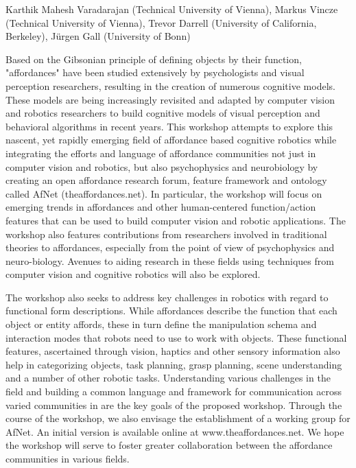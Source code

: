 \begin{spacing}{1.0}
{Karthik Mahesh Varadarajan (Technical University of Vienna), Markus Vincze (Technical University of Vienna), Trevor Darrell (University of California, Berkeley), Jürgen Gall (University of Bonn)}
{
Based on the Gibsonian principle of defining objects by their function, "affordances" have been studied extensively by psychologists and visual perception researchers, resulting in the creation of numerous cognitive models. These models are being increasingly revisited and adapted by computer vision and robotics researchers to build cognitive models of visual perception and behavioral algorithms in recent years. This workshop attempts to explore this nascent, yet rapidly emerging field of affordance based cognitive robotics while integrating the efforts and language of affordance communities not just in computer vision and robotics, but also psychophysics and neurobiology by creating an open affordance research forum, feature framework and ontology called AfNet (theaffordances.net). In particular, the workshop will focus on emerging trends in affordances and other human-centered function/action features that can be used to build computer vision and robotic applications. The workshop also features contributions from researchers involved in traditional theories to affordances, especially from the point of view of psychophysics and neuro-biology. Avenues to aiding research in these fields using techniques from computer vision and cognitive robotics will also be explored.

The workshop also seeks to address key challenges in robotics with regard to functional form descriptions. While affordances describe the function that each object or entity affords, these in turn define the manipulation schema and interaction modes that robots need to use to work with objects. These functional features, ascertained through vision, haptics and other sensory information also help in categorizing objects, task planning, grasp planning, scene understanding and a number of other robotic tasks. Understanding various challenges in the field and building a common language and framework for communication across varied communities in are the key goals of the proposed workshop. Through the course of the workshop, we also envisage the establishment of a working group for AfNet. An initial version is available online at www.theaffordances.net. We hope the workshop will serve to foster greater collaboration between the affordance communities in various fields.
}



\end{spacing}
